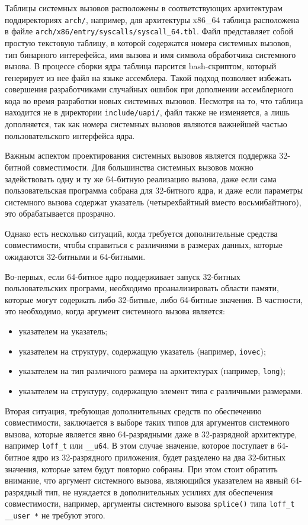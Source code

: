 Таблицы системных вызовов расположены в соответствующих архитектурам
поддиректориях \texttt{arch/}, например, для архитектуры x86\_64 таблица
расположена в файле \texttt{arch/x86/entry/syscalls/syscall\_64.tbl}.
Файл представляет собой простую текстовую таблицу, в которой содержатся
номера системных вызовов, тип бинарного интерефейса, имя вызова и имя символа
обработчика системного вызова. В процессе сборки ядра таблица парсится
bash-скриптом, который генерирует из нее файл на языке ассемблера. Такой подход
позволяет избежать совершения разработчиками случайных ошибок при дополнении
ассемблерного кода во время разработки новых системных вызовов. Несмотря на то,
что таблица находится не в директории \texttt{include/uapi/}, файл также не
изменяется, а лишь дополняется, так как номера системных вызовов являются
важнейшей частью пользовательского интерфейса ядра.

Важным аспектом проектирования системных вызовов является поддержка 32-битной
совместимости. Для большинства системных вызовов можно задействовать одну и ту
же 64-битную реализацию вызова, даже если сама пользовательская программа
собрана для 32-битного ядра, и даже если параметры системного вызова содержат
указатель (четырехбайтный вместо восьмибайтного), это обрабатывается прозрачно.

Однако есть несколько ситуаций, когда требуется дополнительные средства
совместимости, чтобы справиться с различиями в размерах данных, которые
ожидаются  32-битными и 64-битными.

Во-первых, если 64-битное ядро поддерживает запуск 32-битных пользовательских
программ, необходимо проанализировать области памяти, которые могут содержать
либо 32-битные, либо 64-битные значения. В частности, это необходимо, когда
аргумент системного вызова является:
\begin{itemize}
\item указателем на указатель;
\item указателем на структуру, содержащую указатель (например, \texttt{iovec});
\item указателем на тип различного размера на архитектурах (например,
  \texttt{long});
\item указателем на структуру, содержащую элемент типа с различными размерами.
\end{itemize}

Вторая ситуация, требующая дополнительных средств по обеспечению совместимости,
заключается в выборе таких типов для аргументов системного вызова, которые
является явно 64-разрядными даже в 32-разрядной архитектуре, например
\texttt{loff\_t} или \texttt{\_\_u64}. В этом случае значение, которое поступает
в 64-битное ядро из 32-разрядного приложения, будет разделено на два 32-битных
значения, которые затем будут повторно собраны. При этом стоит обратить
внимание, что аргумент системного вызова, являющийся указателем на явный
64-разрядный тип, не нуждается в дополнительных усилиях для обеспечения
совместимости, например, аргументы системного вызова \texttt{splice()} типа
\texttt{loff\_t \_\_user *} не требуют этого.

